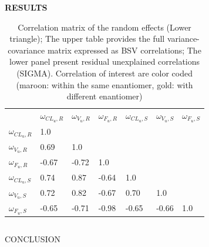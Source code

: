 \documentclass[final]{beamer}
\newlength{\colwidth}
\begin{document}
\begin{frame}[t]
\begin{columns}[t]
\begin{column}{\colwidth}
\begin{block}{\textbf{RESULTS}}
    \begin{table}[]
      \label{tab:2}
      \caption{Correlation matrix of the random effects (Lower triangle); The upper table provides the full variance- covariance matrix expressed as BSV correlations; The lower panel present residual unexplained correlations (SIGMA). Correlation of interest are color coded (maroon: within the same enantiomer, gold: with different enantiomer)}
      \centering
    \begin{tabularx}{0.7\colwidth}{@{}lllllll@{}}
                                            & $\omega_{CL_u, R}$ & $\omega_{V_u, R}$ & $\omega_{F_u, R}$ & $\omega_{CL_u, S}$ & $\omega_{V_u, S}$ & $\omega_{F_u, S}$ \\ \cmidrule(l){2-7}
    \multicolumn{1}{l|}{$\omega_{CL_u, R}$} & 1.0                &                   &                   &                    &                   &                   \\
    \multicolumn{1}{l|}{$\omega_{V_u, R}$}  & 0.69               & 1.0               &                   &                    &                   &                   \\
    \multicolumn{1}{l|}{$\omega_{F_u, R}$}  & -0.67              & -0.72             & 1.0               &                    &                   &                   \\
    \multicolumn{1}{l|}{$\omega_{CL_u, S}$} & 0.74               & 0.87              & -0.64             & 1.0                &                   &                   \\
    \multicolumn{1}{l|}{$\omega_{V_u, S}$}  & 0.72               & 0.82              & -0.67             & 0.70               & 1.0               &                   \\
    \multicolumn{1}{l|}{$\omega_{F_u, S}$}  & -0.65              & -0.71             & -0.98             & -0.65              & -0.66             & 1.0
  \end{tabularx}
    \end{table}
\end{block}
\end{column}

\end{columns}
\begin{columns}[t]
\begin{column}{0.9\paperwidth}
    \begin{alertblock}{CONCLUSION}


\end{alertblock}
\end{column}
\end{columns}
\end{frame}
\end{document}
